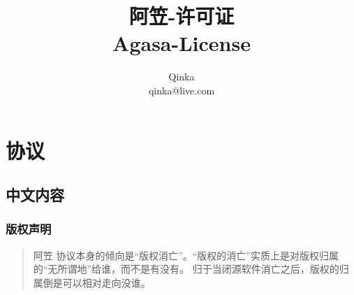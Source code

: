 \documentclass[UTF8]{book}
\author{Qinka \\ qinka@live.com}
\title{阿笠-许可证\\Agasa-License}
\begin{document}
\maketitle
\tableofcontents

\part{协议}
\chapter{中文内容}
\section{版权声明}
\begin{quote}
    阿笠 协议本身的倾向是“版权消亡”。“版权的消亡”实质上是对版权归属的“无所谓地”给谁，而不是有没有。
    归于当闭源软件消亡之后，版权的归属倒是可以相对走向没谁。
\end{quote}
    
\end{document}
